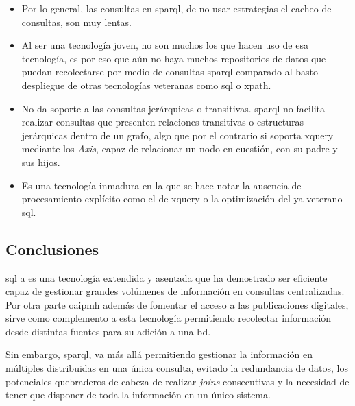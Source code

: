 \begin{itemize}
	\item Por lo general, las consultas en \acrshort{sparql}, de no usar estrategias el cacheo de consultas\cite{SPARQL_Performance}, son muy lentas.

	\item Al ser una tecnología joven, no son muchos los que hacen uso de esa tecnología, es por eso que aún no haya muchos repositorios de datos que puedan recolectarse por medio de consultas \acrshort{sparql} comparado al basto despliegue de otras tecnologías veteranas como \acrshort{sql} o \acrshort{xpath}\cite{XPath}.

	\item No da soporte a las consultas jerárquicas o transitivas. \acrshort{sparql} no facilita realizar consultas que presenten relaciones transitivas o estructuras jerárquicas dentro de un grafo, algo que por el contrario si soporta \acrshort{xquery} mediante los \textit{Axis}, capaz de relacionar un nodo en cuestión, con su padre y sus hijos\cite{XQueryAxes}.

	\item Es una tecnología inmadura en la que se hace notar la ausencia de procesamiento explícito como el de \acrshort{xquery} o la optimización del ya veterano \acrshort{sql}.
\end{itemize}

\subsection{Conclusiones}

\acrshort{sql} a es una tecnología extendida y asentada que ha demostrado ser eficiente capaz de gestionar grandes volúmenes de información en consultas centralizadas. Por otra parte \acrshort{oaipmh} además de fomentar el acceso a las publicaciones digitales, sirve como complemento a esta tecnología permitiendo recolectar información desde distintas fuentes para su adición a una \acrshort{bd}.

Sin embargo, \acrshort{sparql}, va más allá permitiendo gestionar la información en múltiples  distribuidas en una única consulta, evitado la redundancia de datos, los potenciales quebraderos de cabeza de realizar \textit{joins} consecutivas y la necesidad de tener que disponer de toda la información en un único sistema.

